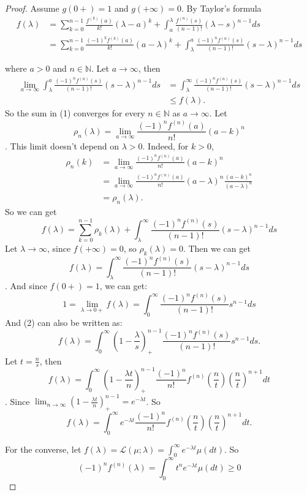 \documentclass[11pt]{article}
\def\ML{{\mathcal L}}
\def\BN{{\mathbb N}}
\begin{document}
\begin{proof}
  Assume $g(0+) = 1$ and $g(+\infty) = 0$. By Taylor's formula
  \begin{equation}\begin{split} 
    f(\lambda) &= \sum_{k=0}^{n-1} \frac{f^{(k)}(a)}{k!} (\lambda - a)^k + \int_a^\lambda \frac{f^{(n)}(s)}{(n-1)!}(\lambda - s)^{n-1} ds \\
    &= \sum_{k=0}^{n-1} \frac{(-1)^k f^{(k)}(a)}{k!} (a-\lambda)^k + \int_\lambda^a \frac{(-1)^nf^{(n)}(s)}{(n-1)!} (s-\lambda)^{n-1} ds  
  \end{split}\end{equation}
  
  where $a > 0$ and $n \in \BN$. Let $a \to \infty$, then 
  \[\begin{split}
    \lim_{a\to\infty} \int_\lambda^a \frac{(-1)^n f^{(n)}(s)}{(n-1)!} (s-\lambda)^{n-1} ds &= 
    \int_\lambda^\infty \frac{(-1)^n f^{(n)}(s)}{(n-1)!} (s-\lambda)^{n-1} ds \\
    &\leq f(\lambda).
  \end{split}\]
  So the sum in (1) converges for every $n \in \BN$ as $a \to \infty$. Let 
  \[ \rho_n(\lambda) = \lim_{a \to \infty} \frac{(-1)^n f^{(n)}(a)}{n!} (a-k)^n\].
  This limit doesn't depend on $\lambda > 0$. Indeed, for $k>0$,
  \[\begin{split}
    \rho_n(k) &= \lim_{a \to \infty} \frac{(-1)^n f^{(n)}(a)}{n!} (a - k)^n  \\
    &= \lim_{a \to \infty} \frac{(-1)^n f^{(n)}(a)}{n!} (a-\lambda)^n \frac{(a -k)^n}{(a-\lambda)^n} \\
    &= \rho_n(\lambda).
  \end{split}\]
  So we can get 
  \[ f(\lambda) = \sum_{k=0}^{n-1} \rho_k(\lambda) + \int_\lambda^\infty \frac{(-1)^n f^{(n)}(s)}{(n-1)!} (s-\lambda)^{n-1} ds\]
  Let $\lambda \to \infty$, since $f(+\infty) = 0$, so $\rho_k(\lambda) = 0$. Then we can get 
  \begin{equation} f(\lambda) = \int_\lambda^\infty \frac{(-1)^nf^{(n)}(s)}{(n-1)!}(s-\lambda)^{n-1} ds\end{equation}. 
  And since $f(0+) = 1$, we can get:
  \[1 = \lim_{\lambda \to 0+} f(\lambda) = \int_0^\infty \frac{(-1)^nf^{(n)}(s)}{(n-1)!} s^{n-1} ds\]
  And (2) can also be written as:
  \[ f(\lambda) = \int_0^\infty (1-\frac{\lambda}{s})_+^{n-1} \frac{(-1)^nf^{(n)}(s)}{(n-1)!} s^{n-1}ds. \]
 Let $t = \frac{n}{s}$, then 
 \[ f(\lambda) = \int_0^\infty (1-\frac{\lambda t}{n})^{n-1}_+ \frac{(-1)^n}{n!}f^{(n)}(\frac{n}{t}) (\frac{n}{t})^{n+1} dt\].
 Since $\lim_{n\to\infty} (1-\frac{\lambda t}{n})^{n-1}_+ = e^{-\lambda t}$. So
 \[ f(\lambda) = \int_0^\infty e^{-\lambda t} \frac{(-1)^n}{n!}f^{(n)}(\frac{n}{t}) (\frac{n}{t})^{n+1} dt.\]
 
 For the converse, let $f(\lambda) = \ML(\mu; \lambda) = \int_0^\infty e^{-\lambda t} \mu(dt)$. So
 \[(-1)^n f^{(n)}(\lambda) = \int_0^\infty t^n e^{-\lambda t} \mu(dt) \geq 0\]
\end{proof}
\end{document}
